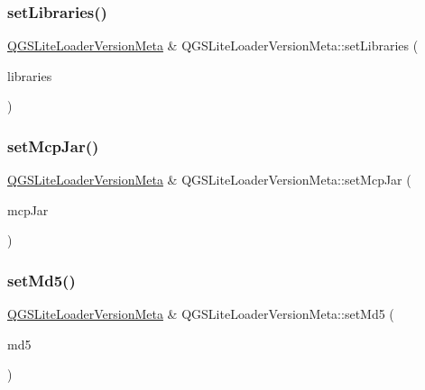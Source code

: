 \mbox{\label{class_q_g_s_lite_loader_version_meta_a368ca504ca58c6fbab9e5b6ddb1bad67}} 
\subsubsection{\texorpdfstring{set\+Libraries()}{setLibraries()}}
{\footnotesize\ttfamily \mbox{\hyperlink{class_q_g_s_lite_loader_version_meta}{Q\+G\+S\+Lite\+Loader\+Version\+Meta}} \& Q\+G\+S\+Lite\+Loader\+Version\+Meta\+::set\+Libraries (\begin{DoxyParamCaption}\item[{const Q\+List$<$ \mbox{\hyperlink{class_q_g_s_library}{Q\+G\+S\+Library}} $>$ \&}]{libraries }\end{DoxyParamCaption})}

\mbox{\label{class_q_g_s_lite_loader_version_meta_a916bf909b4b76f0f55a6a90e05d00227}} 
\subsubsection{\texorpdfstring{set\+Mcp\+Jar()}{setMcpJar()}}
{\footnotesize\ttfamily \mbox{\hyperlink{class_q_g_s_lite_loader_version_meta}{Q\+G\+S\+Lite\+Loader\+Version\+Meta}} \& Q\+G\+S\+Lite\+Loader\+Version\+Meta\+::set\+Mcp\+Jar (\begin{DoxyParamCaption}\item[{const Q\+String \&}]{mcp\+Jar }\end{DoxyParamCaption})}

\mbox{\label{class_q_g_s_lite_loader_version_meta_ad3ca0846e7a8478cf4d3fe479d5f56ef}} 
\subsubsection{\texorpdfstring{set\+Md5()}{setMd5()}}
{\footnotesize\ttfamily \mbox{\hyperlink{class_q_g_s_lite_loader_version_meta}{Q\+G\+S\+Lite\+Loader\+Version\+Meta}} \& Q\+G\+S\+Lite\+Loader\+Version\+Meta\+::set\+Md5 (\begin{DoxyParamCaption}\item[{const Q\+String \&}]{md5 }\end{DoxyParamCaption})}

